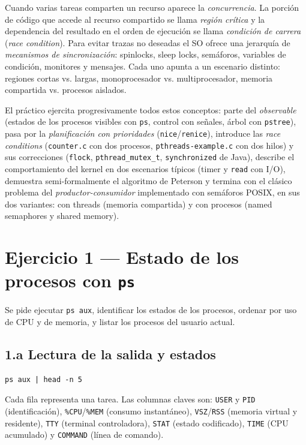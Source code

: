 \documentclass[11pt,a4paper]{article}
\begin{document}
Cuando varias tareas comparten un recurso aparece la \emph{concurrencia}.
La porción de código que accede al recurso compartido se llama
\emph{región crítica} y la dependencia del resultado en el orden de
ejecución se llama \emph{condición de carrera} (\emph{race condition}).
Para evitar trazas no deseadas el SO ofrece una jerarquía de
\emph{mecanismos de sincronización}: spinlocks, sleep locks, semáforos,
variables de condición, monitores y mensajes. Cada uno apunta a un
escenario distinto: regiones cortas vs. largas, monoprocesador vs.
multiprocesador, memoria compartida vs. procesos aislados.

El práctico ejercita progresivamente todos estos conceptos: parte del
\emph{observable} (estados de los procesos visibles con \texttt{ps},
control con señales, árbol con \texttt{pstree}), pasa por la
\emph{planificación con prioridades} (\texttt{nice}/\texttt{renice}),
introduce las \emph{race conditions} (\texttt{counter.c} con dos
procesos, \texttt{pthreads-example.c} con dos hilos) y sus correcciones
(\texttt{flock}, \texttt{pthread\_mutex\_t}, \texttt{synchronized} de
Java), describe el comportamiento del kernel en dos escenarios típicos
(timer y \texttt{read} con I/O), demuestra semi-formalmente el algoritmo
de Peterson y termina con el clásico problema del \emph{productor-consumidor}
implementado con semáforos POSIX, en sus dos variantes: con threads
(memoria compartida) y con procesos (named semaphores y shared memory).

\section{Ejercicio 1 --- Estado de los procesos con \texttt{ps}}

Se pide ejecutar \texttt{ps aux}, identificar los estados de los
procesos, ordenar por uso de CPU y de memoria, y listar los procesos
del usuario actual.

\subsection*{1.a Lectura de la salida y estados}

\begin{lstlisting}
ps aux | head -n 5
\end{lstlisting}

Cada fila representa una tarea. Las columnas claves son:
\texttt{USER} y \texttt{PID} (identificación), \texttt{\%CPU}/\texttt{\%MEM}
(consumo instantáneo), \texttt{VSZ}/\texttt{RSS} (memoria virtual y
residente), \texttt{TTY} (terminal controladora), \texttt{STAT} (estado
codificado), \texttt{TIME} (CPU acumulado) y \texttt{COMMAND} (línea de
comando).
\end{document}
